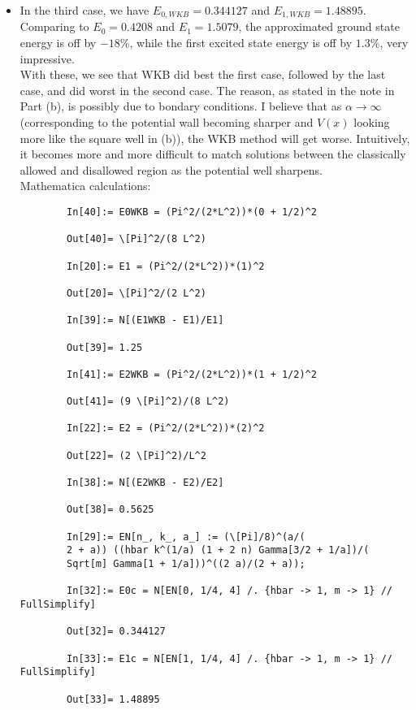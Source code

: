 \documentclass{article}
\theoremstyle{definition}
\newcommand{\al}{\alpha}
\begin{document}
\begin{enumerate}[label=(\alph*)]
\begin{itemize}
		\item In the third case, we have $E_{0,WKB} = \boxed{0.344127}$ and $E_{1,WKB} = \boxed{1.48895}$. Comparing to $E_0 = 0.4208$ and $E_1 = 1.5079$, the approximated ground state energy is off by $-18\%$, while the first excited state energy is off by $1.3\%$, very impressive. \\
		
		
		With these, we see that WKB did best the first case, followed by the last case, and did worst in the second case. The reason, as stated in the note in Part (b), is possibly due to bondary conditions. I believe that as $\al \to \infty$ (corresponding to the potential wall becoming sharper and $V(x)$ looking more like the square well in (b)), the WKB method will get worse. Intuitively, it becomes more and more difficult to match solutions between the classically allowed and disallowed region as the potential well sharpens. \\
		
		
		Mathematica calculations:
		\begin{lstlisting}
		In[40]:= E0WKB = (Pi^2/(2*L^2))*(0 + 1/2)^2
		
		Out[40]= \[Pi]^2/(8 L^2)
		
		In[20]:= E1 = (Pi^2/(2*L^2))*(1)^2
		
		Out[20]= \[Pi]^2/(2 L^2)
		
		In[39]:= N[(E1WKB - E1)/E1]
		
		Out[39]= 1.25
		
		In[41]:= E2WKB = (Pi^2/(2*L^2))*(1 + 1/2)^2
		
		Out[41]= (9 \[Pi]^2)/(8 L^2)
		
		In[22]:= E2 = (Pi^2/(2*L^2))*(2)^2
		
		Out[22]= (2 \[Pi]^2)/L^2
		
		In[38]:= N[(E2WKB - E2)/E2]
		
		Out[38]= 0.5625
		
		In[29]:= EN[n_, k_, a_] := (\[Pi]/8)^(a/(
		2 + a)) ((hbar k^(1/a) (1 + 2 n) Gamma[3/2 + 1/a])/(
		Sqrt[m] Gamma[1 + 1/a]))^((2 a)/(2 + a));
		
		In[32]:= E0c = N[EN[0, 1/4, 4] /. {hbar -> 1, m -> 1} // FullSimplify]
		
		Out[32]= 0.344127
		
		In[33]:= E1c = N[EN[1, 1/4, 4] /. {hbar -> 1, m -> 1} // FullSimplify]
		
		Out[33]= 1.48895
		\end{lstlisting}
	\end{itemize}
\end{enumerate}	
	
\end{document}
